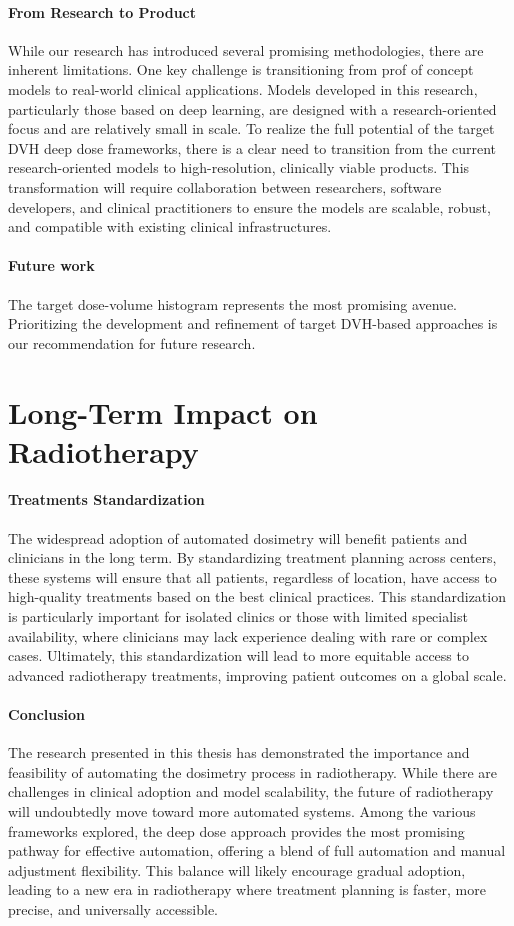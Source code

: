\paragraph{From Research to Product}
While our research has introduced several promising methodologies, there are inherent limitations.
One key challenge is transitioning from prof of concept models to real-world clinical applications.
Models developed in this research, particularly those based on deep learning, are designed with a research-oriented focus and are relatively small in scale.
To realize the full potential of the target DVH deep dose frameworks, there is a clear need to transition from the current research-oriented models to high-resolution, clinically viable products.
This transformation will require collaboration between researchers, software developers, and clinical practitioners to ensure the models are scalable, robust, and compatible with existing clinical infrastructures.

\paragraph{Future work}
The target dose-volume histogram represents the most promising avenue.
Prioritizing the development and refinement of target DVH-based approaches is our recommendation for future research.

\section{Long-Term Impact on Radiotherapy}
\paragraph{Treatments Standardization}
The widespread adoption of automated dosimetry will benefit patients and clinicians in the long term.
By standardizing treatment planning across centers, these systems will ensure that all patients, regardless of location, have access to high-quality treatments based on the best clinical practices.
This standardization is particularly important for isolated clinics or those with limited specialist availability, where clinicians may lack experience dealing with rare or complex cases.
Ultimately, this standardization will lead to more equitable access to advanced radiotherapy treatments, improving patient outcomes on a global scale.

\paragraph{Conclusion}
The research presented in this thesis has demonstrated the importance and feasibility of automating the dosimetry process in radiotherapy.
While there are challenges in clinical adoption and model scalability, the future of radiotherapy will undoubtedly move toward more automated systems.
Among the various frameworks explored, the deep dose approach provides the most promising pathway for effective automation, offering a blend of full automation and manual adjustment flexibility.
This balance will likely encourage gradual adoption, leading to a new era in radiotherapy where treatment planning is faster, more precise, and universally accessible.
